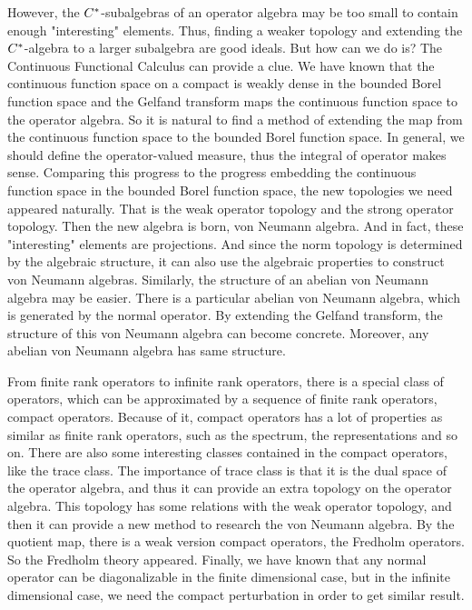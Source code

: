 However, the $C^{*}$-subalgebras of an operator algebra may be too small to contain enough "interesting" elements. Thus, finding a weaker topology and extending the $C^{*}$-algebra to a larger subalgebra are good ideals. But how can we do is? The Continuous Functional Calculus can provide a clue. We have known that the continuous function space on a compact is weakly dense in the bounded Borel function space and the Gelfand transform maps the continuous function space to the operator algebra. So it is natural to find a method of extending the map from the continuous function space to the bounded Borel function space. In general, we should define the operator-valued measure, thus the integral of operator makes sense. Comparing this progress to the progress embedding the continuous function space in the bounded Borel function space, the new topologies we need appeared naturally. That is the weak operator topology and the strong operator topology. Then the new algebra is born, von Neumann algebra. And in fact, these "interesting" elements are projections. And since the norm topology is determined by the algebraic structure, it can also use the algebraic properties to construct von Neumann algebras. Similarly, the structure of an abelian von Neumann algebra may be easier. There is a particular abelian von Neumann algebra, which is generated by the normal operator. By extending the Gelfand transform, the structure of this von Neumann algebra can become concrete. Moreover, any abelian von Neumann algebra has same structure.

From finite rank operators to infinite rank operators, there is a special class of operators, which can be approximated by a sequence of finite rank operators, compact operators. Because of it, compact operators has a lot of properties as similar as finite rank operators, such as the spectrum, the representations and so on. There are also some interesting classes contained in the compact operators, like the trace class. The importance of trace class is that it is the dual space of the operator algebra, and thus it can provide an extra topology on the operator algebra. This topology has some relations with the weak operator topology, and then it can provide a new method to research the von Neumann algebra. By the quotient map, there is a weak version compact operators, the Fredholm operators. So the Fredholm theory appeared. Finally, we have known that any normal operator can be diagonalizable in the finite dimensional case, but in the infinite dimensional case, we need the compact perturbation in order to get similar result. 

